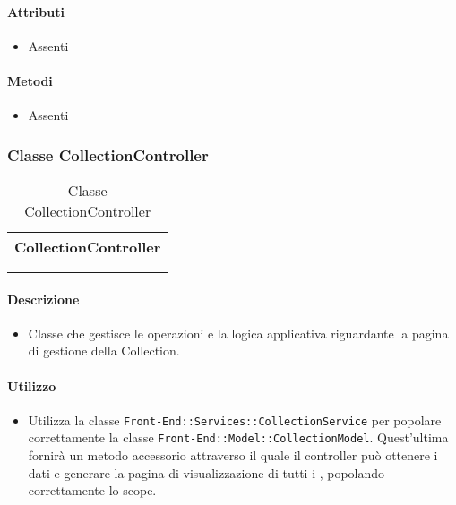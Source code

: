 \paragraph*{Attributi}
\begin{itemize}
\item[] Assenti
\end{itemize}

\paragraph*{Metodi}
\begin{itemize}
\item[] Assenti
\end{itemize}

\subsubsection{Classe CollectionController}

\begin{table}[ht]
\begin{center}
\bgroup
\setlength{\arrayrulewidth}{0.6mm}
\def\arraystretch{1}
\begin{tabular}{ | p{12cm} | }
\hline
\centerline{\textbf{CollectionController}}
\\ \hline
 \\ 
\hline
 \\ 
\hline
\end{tabular}
\egroup
\caption{Classe CollectionController}
\end{center}
\end{table}

\paragraph*{Descrizione}
\begin{itemize}
\item[] Classe che gestisce le operazioni e la logica applicativa riguardante la pagina di gestione della Collection.
\end{itemize}

\paragraph*{Utilizzo}
\begin{itemize}
\item[] Utilizza la classe \texttt{Front-End::Services::CollectionService} per popolare correttamente la classe \texttt{Front-End::Model::CollectionModel}. Quest'ultima fornirà un metodo accessorio attraverso il quale il controller può ottenere i dati e generare la pagina di visualizzazione di tutti i , popolando correttamente lo scope.
\end{itemize}

